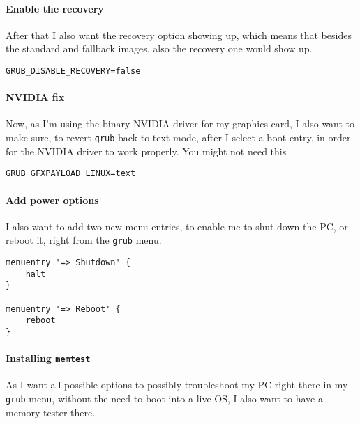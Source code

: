 \documentclass[9pt]{report}
\begin{document}
\newpage

\hypertarget{x-enable-the-recovery}{\paragraph{Enable the recovery}}
After that I also want the recovery option showing up, which means that besides the standard and fallback images, also the recovery one would show up.


\begin{verbatim}
GRUB_DISABLE_RECOVERY=false
\end{verbatim}


\newpage

\hypertarget{x-nvidia-fix}{\paragraph{NVIDIA fix}}
Now, as I’m using the binary NVIDIA driver for my graphics card, I also want to make sure, to revert \texttt{grub} back to text mode, after I select a boot entry, in order for the NVIDIA driver to work properly.
You might not need this


\begin{verbatim}
GRUB_GFXPAYLOAD_LINUX=text
\end{verbatim}


\newpage

\hypertarget{x-add-power-options}{\paragraph{Add power options}}
I also want to add two new menu entries, to enable me to shut down the PC, or reboot it, right from the \texttt{grub} menu.


\begin{verbatim}
menuentry '=> Shutdown' {
    halt
}

menuentry '=> Reboot' {
    reboot
}
\end{verbatim}


\newpage

\hypertarget{x-installing-memtest}{\paragraph{Installing \texttt{memtest}}}
As I want all possible options to possibly troubleshoot my PC right there in my \texttt{grub} menu,  without the need to boot into a live OS, I also want to have a memory tester there.
\end{document}
